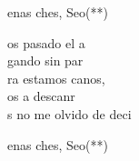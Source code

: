 \begin{cancion}%
	\begin{chorus}%
	enas ches, Seo(**)\\
	\end{chorus}%
	os pasado el a \\
	gando sin par\\
	ra estamos canos,\\
	os a descanr\\
	s no me olvido de deci\\
	\begin{chorus}%
	enas ches, Seo(**)\\
	\end{chorus}%
\end{cancion}%
